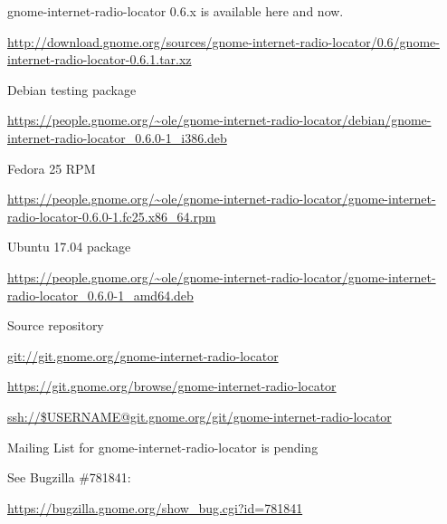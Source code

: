 \documentclass[20pt,landscape]{foils}
\begin{document}
\begin{list1}
\item gnome-internet-radio-locator 0.6.x is available here and now.
  \begin{list2}
  \item \begin{tiny}\url{http://download.gnome.org/sources/gnome-internet-radio-locator/0.6/gnome-internet-radio-locator-0.6.1.tar.xz}\end{tiny}
  \end{list2}
\item Debian testing package
  \begin{list2}
  \item \begin{tiny}\url{https://people.gnome.org/~ole/gnome-internet-radio-locator/debian/gnome-internet-radio-locator_0.6.0-1_i386.deb}\end{tiny}
  \end{list2}
\item Fedora 25 RPM
  \begin{list2}
  \item \begin{tiny}\url{https://people.gnome.org/~ole/gnome-internet-radio-locator/gnome-internet-radio-locator-0.6.0-1.fc25.x86_64.rpm}\end{tiny}
  \end{list2}
\item Ubuntu 17.04 package
  \begin{list2}
  \item \begin{tiny}\url{https://people.gnome.org/~ole/gnome-internet-radio-locator/gnome-internet-radio-locator_0.6.0-1_amd64.deb}\end{tiny}
  \end{list2}
\item Source repository
  \begin{list2}
    \item \url{git://git.gnome.org/gnome-internet-radio-locator}
    \item \url{https://git.gnome.org/browse/gnome-internet-radio-locator}
    \item \url{ssh://$USERNAME@git.gnome.org/git/gnome-internet-radio-locator}
  \end{list2}
\item Mailing List for gnome-internet-radio-locator is pending\\
  \begin{list2}
  \item See Bugzilla \#781841: \begin{tiny}\url{https://bugzilla.gnome.org/show_bug.cgi?id=781841}\begin{verbatim}


\end{verbatim}
\end{tiny}
\end{list2}
\end{list1}
\end{document}

